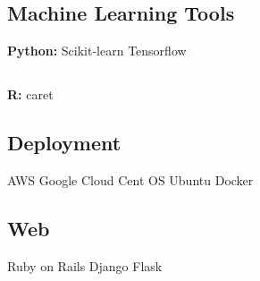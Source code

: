 \documentclass[]{deedy-resume-openfont}
\begin{document}
\begin{minipage}[t]{0.33\textwidth}
\subsection{Machine Learning Tools}
\textbf{Python:} Scikit-learn \textbullet{} Tensorflow \\
\subsection{}
\textbf{R:} caret \\

\subsection{}
\subsection{Deployment}
\textbullet{} AWS \textbullet{} Google Cloud \textbullet{} Cent OS  \textbullet{} Ubuntu \textbullet{} Docker \\

\subsection{}
\subsection{Web}
\textbullet{} Ruby on Rails \textbullet{} Django \textbullet{} Flask


%
%

\end{minipage} 
\hfill
\end{document}
